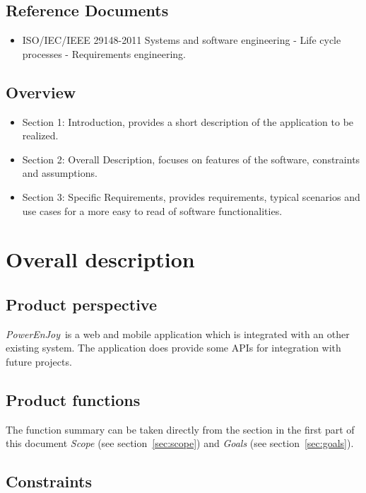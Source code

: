 \documentclass{article}
\newcommand{\pej}{\mbox{\normalfont\itshape PowerEnJoy }}
\begin{document}
		\subsection{Reference Documents}
		\begin{itemize}
			\item ISO/IEC/IEEE 29148-2011 Systems and software engineering - Life cycle processes - Requirements engineering.
		\end{itemize}
	
		\subsection{Overview}
		\begin{itemize}
			\item Section 1: Introduction, provides a short description of the application to be realized.
			\item Section 2: Overall Description, focuses on features of the software, constraints and assumptions.
			\item Section 3: Specific Requirements, provides requirements, typical scenarios and use cases for a more easy to read of software functionalities.
		\end{itemize}
	\pagebreak
	
	
	\section{Overall description}
	
		\subsection{Product perspective}
		\pej is a web and mobile application which is integrated with an other existing system. The application does provide some APIs for integration with future projects.
		\subsection{Product functions}
		The function summary can be taken directly from the section in the first part of this document {\em Scope} (see section~\ref{sec:scope}) and {\em Goals} (see section~\ref{sec:goals}).
		\subsection{Constraints}
\end{document}
